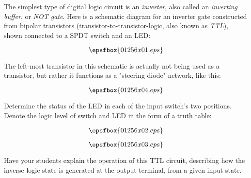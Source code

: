 

The simplest type of digital logic circuit is an {\it inverter}, also called an {\it inverting buffer}, or {\it NOT gate}.  Here is a schematic diagram for an inverter gate constructed from bipolar transistors (transistor-to-transistor-logic, also known as {\it TTL}), shown connected to a SPDT switch and an LED:

$$\epsfbox{01256x01.eps}$$

The left-most transistor in this schematic is actually not being used as a transistor, but rather it functions as a "steering diode" network, like this:

$$\epsfbox{01256x04.eps}$$

Determine the status of the LED in each of the input switch's two positions.  Denote the logic level of switch and LED in the form of a truth table:

$$\epsfbox{01256x02.eps}$$







$$\epsfbox{01256x03.eps}$$







Have your students explain the operation of this TTL circuit, describing how the inverse logic state is generated at the output terminal, from a given input state.




